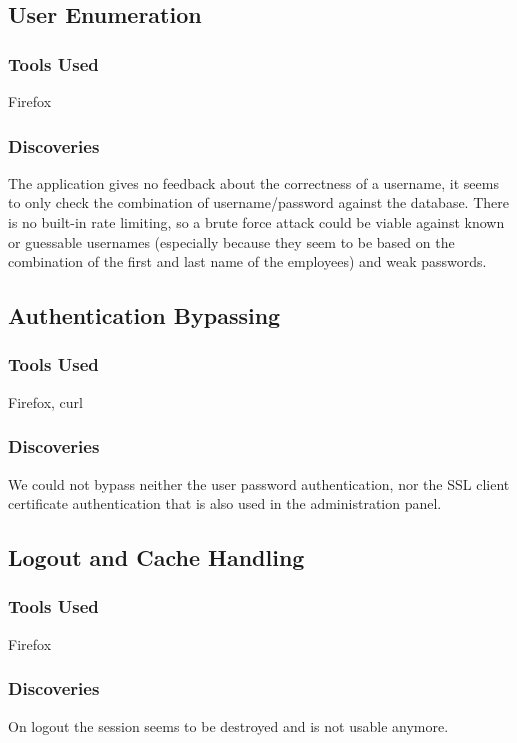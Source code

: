 \documentclass{article}
\begin{document}
\subsection{User Enumeration}
\subsubsection*{Tools Used}
Firefox

\subsubsection*{Discoveries}
The application gives no feedback about the correctness of a username, it seems to only check the combination of username/password against the database. There is no built-in rate limiting, so a brute force attack could be viable against known or guessable usernames (especially because they seem to be based on the combination of the first and last name of the employees) and weak passwords.

\subsection{Authentication Bypassing}
\subsubsection*{Tools Used}
Firefox, curl

\subsubsection*{Discoveries}
We could not bypass neither the user password authentication, nor the SSL client certificate authentication that is also used in the administration panel.

\subsection{Logout and Cache Handling}
\subsubsection*{Tools Used}
Firefox

\subsubsection*{Discoveries}
On logout the session seems to be destroyed and is not usable anymore.
\end{document}
